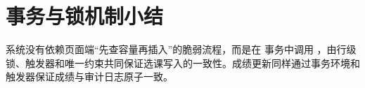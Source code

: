 





\section{事务与锁机制小结}

系统没有依赖页面端“先查容量再插入”的脆弱流程，而是在  事务中调用 ，由行级锁、触发器和唯一约束共同保证选课写入的一致性。成绩更新同样通过事务环境和触发器保证成绩与审计日志原子一致。
